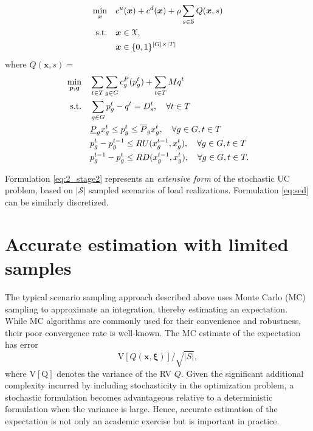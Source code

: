 \documentclass[conference]{IEEEtran}
\newcommand{\xivec}{{\boldsymbol{\xi}}}
\begin{document}
\begin{subequations}\label{eq:2_stage2}
\begin{align}
\min_{\boldsymbol {x}} \quad  &c^u(\boldsymbol x) +
c^d(\boldsymbol x) + \rho \sum_{s \in \mathcal S} Q(\boldsymbol x,s) \label{eq:qx}\\
\textmd{s.t.} \quad & \boldsymbol x \in \mathcal X,\\
& \boldsymbol x \in \{0,1\}^{|G|\times |T|}
\end{align}
\end{subequations}
where
\noindent $Q(\boldsymbol x,s) =$
\begin{subequations}
\label{eq:ed_mod2}
\begin{align}
\min_{\boldsymbol {p, q}} \quad & \sum_{t \in T} \sum_{g \in G} c_g^P(p_g^t) + \sum_{t \in T} Mq^t \label{ed_mod2_obj}\\
\textmd{s.t.}\quad & \sum_{g \in   G}  p_g^t - q^t = D^t_s, \quad \forall t \in T \label{ed_mod2_bal}\\
&\underline P_g x_g^t \leq  p_g^t \leq \overline P_g x_g^t, \quad   \forall g \in G, t \in T \label{ed_mod2_gen_lim} \\
&p_g^{t} -  p_g^{t-1} \leq RU(x_g^{t-1}, x_g^t), \quad  \forall g \in G, t \in T \label{ed_mod2_ru} \\
&p_g^{t-1}-  p_g^t\leq RD(x_g^{t-1}, x_g^t), \quad  \forall g \in G, t \in T \label{ed_mod2_rd}.
\end{align}
\end{subequations}

Formulation \eqref{eq:2_stage2} represents an \emph{extensive form} of the stochastic UC 
problem, based on $|\mathcal{S}|$ sampled scenarios of load realizations. Formulation 
\eqref{eq:sed} can be similarly discretized. 

\section{Accurate estimation with limited samples}
\label{sec:estimation}

The typical scenario sampling approach described above uses
Monte Carlo (MC) sampling to approximate an integration, thereby estimating an
expectation.  While  MC algorithms are commonly used for their convenience and
robustness, their poor convergence rate is well-known.  The MC estimate of the
expectation has error
\begin{equation}
\label{eq:error}
\mathrm{V}[Q(\boldsymbol x, \xivec)]/\sqrt{|S|},
\end{equation} 
where $\mathrm{V[Q]}$ denotes the variance of the RV $Q$.  Given the significant
additional complexity incurred by including stochasticity in the optimization
problem, a stochastic  formulation becomes advantageous relative to a deterministic
formulation when the variance is large.  Hence, accurate estimation of the
expectation is not only an academic exercise but is important in practice.
\end{document}
